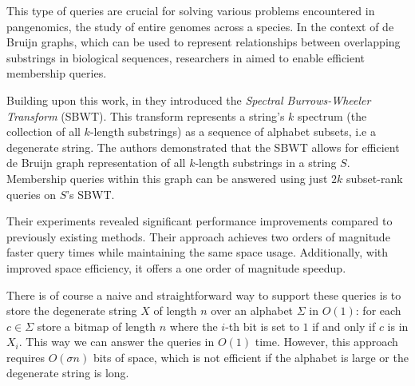 \noindent This type of queries are crucial for solving various problems encountered in pangenomics, the study of entire genomes across a species. In the context of de Bruijn graphs, which can be used to represent relationships between overlapping substrings in biological sequences, researchers in \cite{SubsetWT} aimed to enable efficient membership queries. \vspace{0.4cm}

\noindent Building upon this work, in \cite{alanko2023small} they introduced the \emph{Spectral Burrows-Wheeler Transform} (SBWT). This transform represents a string's $k$ spectrum (the collection of all $k$-length substrings) as a sequence of alphabet subsets, i.e a degenerate string. The authors demonstrated that the SBWT allows for efficient de Bruijn graph representation of all $k$-length substrings in a string $S$. Membership queries within this graph can be answered using just $2k$ subset-rank queries on $S$'s SBWT. \vspace{0.4cm}

\noindent Their experiments revealed significant performance improvements compared to previously  existing methods. Their approach achieves two orders of magnitude faster query times while maintaining the same space usage. Additionally, with improved space efficiency, it offers a one order of magnitude speedup. \vspace{0.4cm}


\vspace{0.4cm}
\noindent There is of course a naive and straightforward way to support these queries is to store the degenerate string $X$ of length $n$ over an alphabet $\Sigma$ in $O(1)$: for each $c \in \Sigma$ store a bitmap of length $n$ where the $i$-th bit is set to $1$ if and only if $c$ is in $X_i$. This way we can answer the queries in $O(1)$ time. However, this approach requires $O(\sigma n)$ bits of space, which is not efficient if the alphabet is large or the degenerate string is long.
